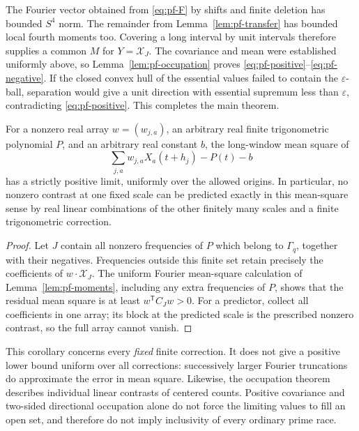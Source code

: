 The Fourier vector obtained from \eqref{eq:pf-F} by shifts and finite
deletion has bounded $S^4$ norm.  The remainder from
Lemma~\ref{lem:pf-transfer} has bounded local fourth moments too.
Covering a long interval by unit intervals therefore supplies a
common $M$ for $Y=\mathcal X_J$.  The covariance and mean were
established uniformly above, so Lemma~\ref{lem:pf-occupation} proves
\eqref{eq:pf-positive}--\eqref{eq:pf-negative}.  If the closed
convex hull of the essential values failed to contain the
$\varepsilon$-ball, separation would give a unit direction with
essential supremum less than $\varepsilon$, contradicting
\eqref{eq:pf-positive}.  This completes the main theorem.

\begin{corollary}
\label{cor:pf-prediction}
For a nonzero real array $w=(w_{j,a})$, an arbitrary real finite
trigonometric polynomial $P$, and an arbitrary real constant $b$,
the long-window mean square of
\[
 \sum_{j,a}w_{j,a}X_a(t+h_j)-P(t)-b
\]
has a strictly positive limit, uniformly over the allowed origins.
In particular, no nonzero contrast at one fixed scale can be
predicted exactly in this mean-square sense by real linear
combinations of the other finitely many scales and a finite
trigonometric correction.
\end{corollary}

\begin{proof}
Let $J$ contain all nonzero frequencies of $P$ which belong to
$\Gamma_q$, together with their negatives.  Frequencies outside
this finite set retain precisely the coefficients of
$w\cdot\mathcal X_J$.  The uniform Fourier mean-square calculation
of Lemma~\ref{lem:pf-moments}, including any extra frequencies of
$P$, shows that the residual mean square is at least
$w^{\mathsf T}C_Jw>0$.  For a predictor, collect all coefficients in
one array; its block at the predicted scale is the prescribed
nonzero contrast, so the full array cannot vanish.
\end{proof}

This corollary concerns every \emph{fixed} finite correction.  It
does not give a positive lower bound uniform over all corrections:
successively larger Fourier truncations do approximate the error
in mean square.  Likewise, the occupation theorem describes
individual linear contrasts of centered counts.  Positive
covariance and two-sided directional occupation alone do not force
the limiting values to fill an open set, and therefore do not
imply inclusivity of every ordinary prime race.
